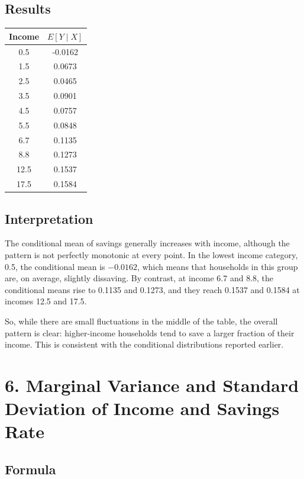 \documentclass[12pt]{article}
\newcommand{\x}{40pt}
\begin{document}
\subsection*{Results}

\begin{center}
\begin{tabular}{cc}
\toprule
Income & $E[Y\mid X]$ \\
\midrule
0.5  & -0.0162 \\
1.5  & 0.0673 \\
2.5  & 0.0465 \\
3.5  & 0.0901 \\
4.5  & 0.0757 \\
5.5  & 0.0848 \\
6.7  & 0.1135 \\
8.8  & 0.1273 \\
12.5 & 0.1537 \\
17.5 & 0.1584 \\
\bottomrule
\end{tabular}
\end{center}

\subsection*{Interpretation}

The conditional mean of savings generally increases with income, although the pattern is not perfectly monotonic at every point. In the lowest income category, 0.5, the conditional mean is $-0.0162$, which means that households in this group are, on average, slightly dissaving. By contrast, at income 6.7 and 8.8, the conditional means rise to 0.1135 and 0.1273, and they reach 0.1537 and 0.1584 at incomes 12.5 and 17.5.

So, while there are small fluctuations in the middle of the table, the overall pattern is clear: higher-income households tend to save a larger fraction of their income. This is consistent with the conditional distributions reported earlier.




\vspace{\x}
\section*{6. Marginal Variance and Standard Deviation of Income and Savings Rate}

\subsection*{Formula}
\end{document}
